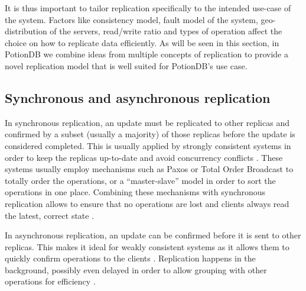 It is thus important to tailor replication specifically to the intended use-case of the system.
Factors like consistency model, fault model of the system, geo-distribution of the servers, read/write ratio and types of operation affect the choice on how to replicate data efficiently.
As will be seen in this section, in PotionDB we combine ideas from multiple concepts of replication to provide a novel replication model that is well suited for PotionDB's use case.

\subsection{Synchronous and asynchronous replication}


In synchronous replication, an update must be replicated to other replicas and confirmed by a subset (usually a majority) of those replicas before the update is considered completed.
This is usually applied by strongly consistent systems in order to keep the replicas up-to-date and avoid concurrency conflicts \cite{dynamo, spanner}.
These systems usually employ mechanisms such as Paxos \cite{paxos} or Total Order Broadcast \cite{tob} to totally order the operations, or a ``master-slave'' model in order to sort the operations in one place.
Combining these mechanisms with synchronous replication allows to ensure that no operations are lost and clients always read the latest, correct state \cite{spanner}.


In asynchronous replication, an update can be confirmed before it is sent to other replicas.
This makes it ideal for weakly consistent systems as it allows them to quickly confirm operations to the clients \cite{cops}.
Replication happens in the background, possibly even delayed in order to allow grouping with other operations for efficiency \cite{dynamo}.



